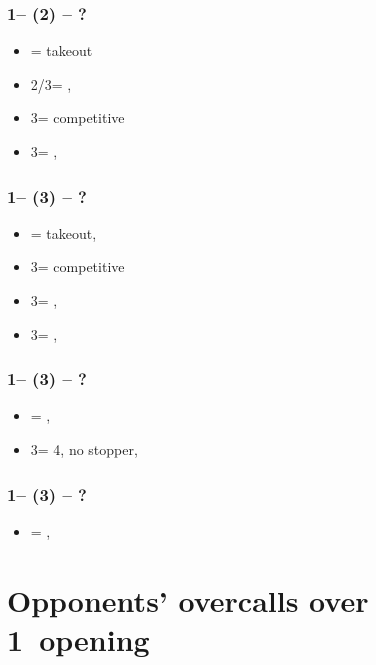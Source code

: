 \documentclass[12pt, a4paper]{report}
\begin{document}
\subsubsection*{1\diams -- (2\spades) -- ?}
\begin{itemize}
    \item \dbl = takeout
    \item 2\nt/3\clubs = \trsf{\clubs/\diams}, \invp
    \item 3\diams = competitive
    \item 3\hearts = \nat, \gf
\end{itemize}

\subsubsection*{1\diams -- (3\clubs) -- ?}
\begin{itemize}
    \item \dbl = takeout, \gf
    \item 3\diams = competitive
    \item 3\hearts = \spades, \invp
    \item 3\spades = \hearts, \gf
\end{itemize}

\subsubsection*{1\diams -- (3\hearts) -- ?}
\begin{itemize}
    \item \dbl = \spades, \gf
    \item 3\spades = 4\spades, no \hearts stopper, \gf
\end{itemize}

\subsubsection*{1\diams -- (3\spades) -- ?}
\begin{itemize}
    \item \dbl = \hearts, \gf
\end{itemize}

\section*{\colorbox{blue!30}{Opponents' overcalls over 1\hearts\ opening}}
\end{document}
